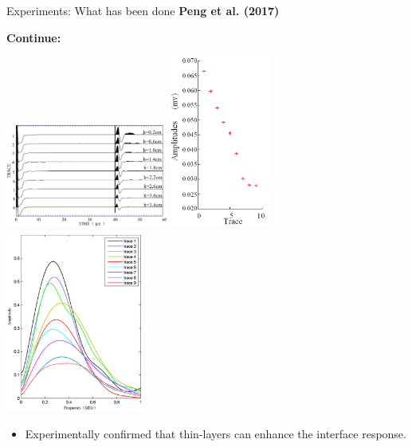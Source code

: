\documentclass[utf8]{beamer} \usetheme{lfcr} %
\begin{document}
%
\begin{frame}{Experiments: What has been done}
  {\textbf{Peng et al. (2017)}}

  \textbf{Continue:}

      \includegraphics[width=0.4\textwidth]{Pengetal2017_4}%
      \includegraphics[width=0.25\textwidth]{Pengetal2017_5}%
      \includegraphics[width=0.34\textwidth]{Pengetal2017_6}%

      \begin{itemize}
        \item{Experimentally confirmed that thin-layers can enhance the interface response.}
      \end{itemize}

\end{frame}
%
\end{document}

